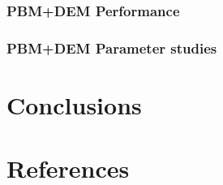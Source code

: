 \documentclass[preprint,11pt,authoryear]{elsarticle}
\begin{document}
\subsubsection{PBM+DEM Performance}
%	


\subsubsection{PBM+DEM Parameter studies}
%	    
\section{Conclusions}

\section*{References} 


\end{document}
